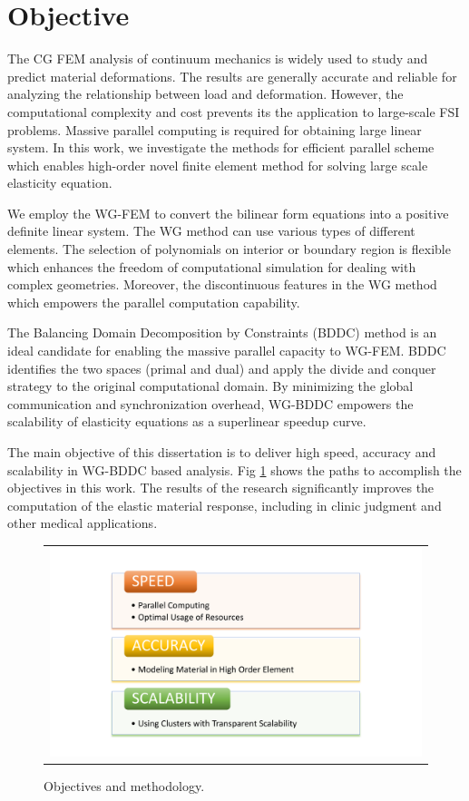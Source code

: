 \section{Objective}

The CG FEM analysis of continuum mechanics is widely used to study and predict material deformations. The results are generally accurate and reliable for analyzing the relationship between load and deformation. However, the computational complexity and cost prevents its the application to large-scale FSI problems. Massive parallel computing is required for obtaining large linear system. In this work, we investigate the methods for efficient parallel scheme which enables high-order novel finite element method for solving large scale elasticity equation.

We employ the WG-FEM to convert the bilinear form equations into a positive definite linear system. The WG method can use various types of different elements. The selection of polynomials on interior or boundary region is flexible which enhances the freedom of computational simulation for dealing with complex geometries. Moreover, the discontinuous features in the WG method which empowers the parallel computation capability.

The Balancing Domain Decomposition by Constraints (BDDC) method is an ideal candidate for enabling the massive parallel capacity to WG-FEM. BDDC identifies the two spaces (primal and dual) and apply the divide and conquer strategy to the original computational domain. By minimizing the global communication and synchronization overhead,  WG-BDDC empowers the scalability of elasticity equations as a superlinear speedup curve.

The main objective of this dissertation is to deliver high speed, accuracy and scalability in WG-BDDC based analysis. Fig \ref{fig: ch1p4} shows the paths to accomplish the objectives in this work. The results of the research significantly improves the computation of the elastic material response, including in clinic judgment and other medical applications.

\begin{figure}[H]
	\centering
	\begin{tabular}{c}
		\includegraphics[width=1.0\textwidth]{./pics/ch1p4}
	\end{tabular}
	\caption{\footnotesize Objectives and methodology.} \label{fig: ch1p4}
\end{figure}

